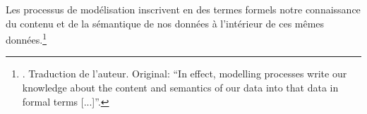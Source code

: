 \begin{displayquote}
	Les processus de modélisation inscrivent en des termes formels notre connaissance du contenu et de la sémantique de nos données à l'intérieur de ces mêmes données.\footnote{
		\cite[p. 9]{flanders_data_2019}. Traduction de l'auteur. Original: \enquote{In effect, modelling processes write our knowledge about the content and semantics of our data into that data in formal terms [...]}.
	}
\end{displayquote}


